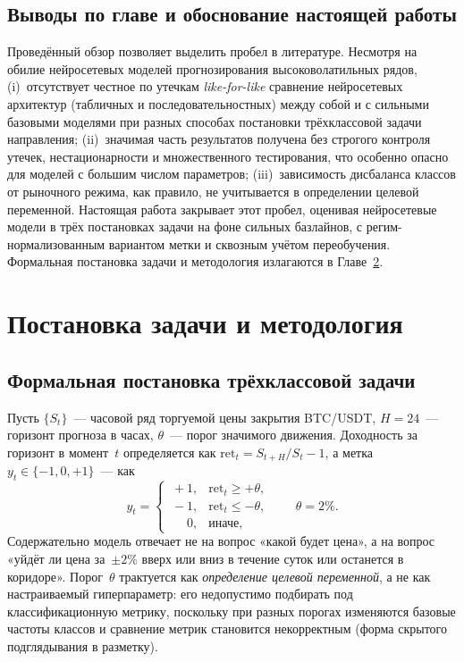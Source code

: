\documentclass[12pt,a4paper]{report}
\begin{document}
\section{Выводы по главе и обоснование настоящей работы}

Проведённый обзор позволяет выделить пробел в литературе. Несмотря на обилие
нейросетевых моделей прогнозирования высоковолатильных рядов, (i)~отсутствует
честное по утечкам \emph{like-for-like} сравнение нейросетевых архитектур (табличных
и последовательностных) между собой и с сильными базовыми моделями при разных
способах постановки трёхклассовой задачи направления; (ii)~значимая часть
результатов получена без строгого контроля утечек, нестационарности и
множественного тестирования, что особенно опасно для моделей с большим числом
параметров; (iii)~зависимость дисбаланса классов от рыночного режима, как правило,
не учитывается в определении целевой переменной. Настоящая работа закрывает этот
пробел, оценивая нейросетевые модели в трёх постановках задачи на фоне сильных
базлайнов, с регим-нормализованным вариантом метки и сквозным учётом переобучения.
Формальная постановка задачи и методология излагаются в Главе~\ref{ch:method}.

\chapter{Постановка задачи и методология}
\label{ch:method}

\section{Формальная постановка трёхклассовой задачи}

Пусть $\{S_t\}$~--- часовой ряд торгуемой цены закрытия BTC/USDT, $H=24$~---
горизонт прогноза в часах, $\theta$~--- порог значимого движения. Доходность за
горизонт в момент~$t$ определяется как $\mathrm{ret}_t = S_{t+H}/S_t - 1$, а метка
$y_t\in\{-1,0,+1\}$~--- как
\begin{equation}
y_t =
\begin{cases}
\,+1, & \mathrm{ret}_t \ge +\theta,\\[2pt]
\,-1, & \mathrm{ret}_t \le -\theta,\\[2pt]
\,\phantom{+}0, & \text{иначе},
\end{cases}
\qquad \theta = 2\%.
\end{equation}
Содержательно модель отвечает не на вопрос «какой будет цена», а на вопрос «уйдёт
ли цена за~$\pm 2\%$ вверх или вниз в течение суток или останется в коридоре».
Порог~$\theta$ трактуется как \emph{определение целевой переменной}, а не как
настраиваемый гиперпараметр: его недопустимо подбирать под классификационную
метрику, поскольку при разных порогах изменяются базовые частоты классов и
сравнение метрик становится некорректным (форма скрытого подглядывания в разметку).
\end{document}
